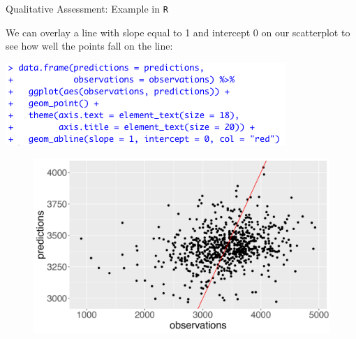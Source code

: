 \documentclass[10pt,t]{beamer}
\begin{document}
\begin{frame}{Qualitative Assessment: Example in \texttt{R}}
	\vspace{-5 mm}
	
	We can overlay a line with slope equal to 1 and intercept 0 on our scatterplot to see how well the points fall on the line:
	
	\vspace{0.3cm}
	
	\centering \includegraphics[scale=0.45]{figures/predict_vs_obs_code2.png} \vspace{0.1cm}
	
	\begin{figure}
		\centering \includegraphics[scale=0.35]{figures/predict_vs_obs2.png}
	\end{figure}
	
\end{frame}
\end{document}
